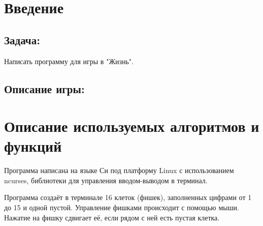 \documentclass[fleqn]{article}
\begin{document}
\tableofcontents

\newpage

\section{Введение}

\subsection{Задача:}

Написать программу для игры в "Жизнь".

\subsection{Описание игры:}



\section{Описание используемых алгоритмов и функций}

Программа написана на языке Си под платформу Linux с использованием ncurses, 
библиотеки для управления вводом-выводом в терминал.

Программа создаёт в терминале 16 клеток (фишек), заполненных цифрами от 1 до 15
и одной пустой. Управление фишками происходит с помощью мыши.
Нажатие на фишку сдвигает её, если рядом с ней есть пустая клетка.
\end{document}
